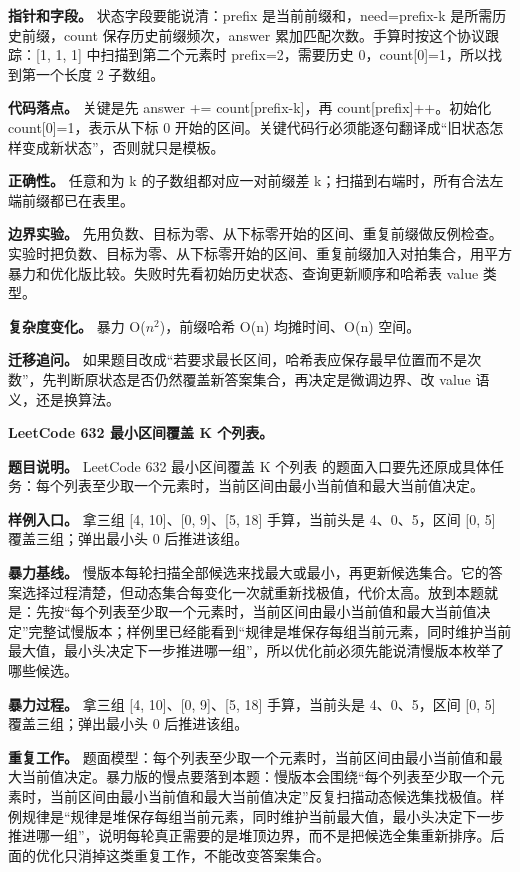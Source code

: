 \textbf{指针和字段。} 状态字段要能说清：prefix 是当前前缀和，need=prefix-k 是所需历史前缀，count 保存历史前缀频次，answer 累加匹配次数。手算时按这个协议跟踪：[1, 1, 1] 中扫描到第二个元素时 prefix=2，需要历史 0，count[0]=1，所以找到第一个长度 2 子数组。

\textbf{代码落点。} 关键是先 answer += count[prefix-k]，再 count[prefix]++。初始化 count[0]=1，表示从下标 0 开始的区间。关键代码行必须能逐句翻译成“旧状态怎样变成新状态”，否则就只是模板。

\textbf{正确性。} 任意和为 k 的子数组都对应一对前缀差 k；扫描到右端时，所有合法左端前缀都已在表里。

\textbf{边界实验。} 先用负数、目标为零、从下标零开始的区间、重复前缀做反例检查。实验时把负数、目标为零、从下标零开始的区间、重复前缀加入对拍集合，用平方暴力和优化版比较。失败时先看初始历史状态、查询更新顺序和哈希表 value 类型。

\textbf{复杂度变化。} 暴力 O(\ensuremath{n^{2}})，前缀哈希 O(n) 均摊时间、O(n) 空间。

\textbf{迁移追问。} 如果题目改成“若要求最长区间，哈希表应保存最早位置而不是次数”，先判断原状态是否仍然覆盖新答案集合，再决定是微调边界、改 value 语义，还是换算法。

\noindent\textbf{LeetCode 632 最小区间覆盖 K 个列表。}

\textbf{题目说明。} LeetCode 632 最小区间覆盖 K 个列表 的题面入口要先还原成具体任务：每个列表至少取一个元素时，当前区间由最小当前值和最大当前值决定。

\textbf{样例入口。} 拿三组 [4, 10]、[0, 9]、[5, 18] 手算，当前头是 4、0、5，区间 [0, 5] 覆盖三组；弹出最小头 0 后推进该组。

\textbf{暴力基线。} 慢版本每轮扫描全部候选来找最大或最小，再更新候选集合。它的答案选择过程清楚，但动态集合每变化一次就重新找极值，代价太高。放到本题就是：先按“每个列表至少取一个元素时，当前区间由最小当前值和最大当前值决定”完整试慢版本；样例里已经能看到“规律是堆保存每组当前元素，同时维护当前最大值，最小头决定下一步推进哪一组”，所以优化前必须先能说清慢版本枚举了哪些候选。

\textbf{暴力过程。} 拿三组 [4, 10]、[0, 9]、[5, 18] 手算，当前头是 4、0、5，区间 [0, 5] 覆盖三组；弹出最小头 0 后推进该组。

\textbf{重复工作。} 题面模型：每个列表至少取一个元素时，当前区间由最小当前值和最大当前值决定。暴力版的慢点要落到本题：慢版本会围绕“每个列表至少取一个元素时，当前区间由最小当前值和最大当前值决定”反复扫描动态候选集找极值。样例规律是“规律是堆保存每组当前元素，同时维护当前最大值，最小头决定下一步推进哪一组”，说明每轮真正需要的是堆顶边界，而不是把候选全集重新排序。后面的优化只消掉这类重复工作，不能改变答案集合。

